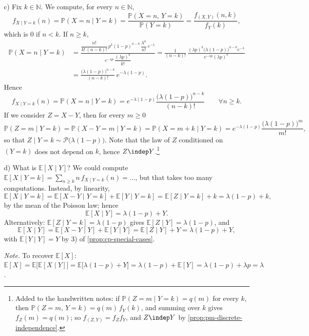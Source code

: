\begin{example}
c) Fix $k\in\mathbb N$. We compute, for every $n\in\mathbb N$,
\[
  f_{X\mid Y=k}(n)=\mathbb P(X=n\mid Y=k)=\frac{\mathbb P(X=n,\,Y=k)}{\mathbb P(Y=k)}=\frac{f_{(X,Y)}(n,k)}{f_Y(k)},
\]
which is $0$ if $n<k$. If $n\ge k$,
\[
\begin{aligned}
  \mathbb P(X=n\mid Y=k)&=\frac{\dfrac{n!}{k!\,(n-k)!}\,p^k(1-p)^{n-k}\,\dfrac{\lambda^n}{n!}\,e^{-\lambda}}{e^{-\lambda p}\,\dfrac{(\lambda p)^k}{k!}}
  =\frac1{(n-k)!}\,\frac{(\lambda p)^k\big(\lambda(1-p)\big)^{n-k}e^{-\lambda}}{e^{-\lambda p}(\lambda p)^k}\\
  &=\frac{\big(\lambda(1-p)\big)^{n-k}}{(n-k)!}\,e^{-\lambda(1-p)} .
\end{aligned}
\]
Hence
\[
  f_{X\mid Y=k}(n)=\mathbb P(X=n\mid Y=k)=e^{-\lambda(1-p)}\frac{\big(\lambda(1-p)\big)^{n-k}}{(n-k)!}\qquad\forall n\ge k .
\]
If we consider $Z=X-Y$, then for every $m\ge0$
\[
  \mathbb P(Z=m\mid Y=k)=\mathbb P(X-Y=m\mid Y=k)=\mathbb P(X=m+k\mid Y=k)=e^{-\lambda(1-p)}\frac{\big(\lambda(1-p)\big)^m}{m!},
\]
so that $Z\mid Y=k\sim\mathcal P\big(\lambda(1-p)\big)$. Note that the law of $Z$ conditioned on
$(Y=k)$ does not depend on $k$, hence $Z\indep Y$.\footnote{Added to the handwritten notes: if
$\mathbb P(Z=m\mid Y=k)=q(m)$ for every $k$, then $\mathbb P(Z=m,\,Y=k)=q(m)\,f_Y(k)$, and summing
over $k$ gives $f_Z(m)=q(m)$; so $f_{(Z,Y)}=f_Zf_Y$, and $Z\indep Y$ by
\cref{prop:pm-discrete-independence}.}

d) What is $\mathbb E[X\mid Y]$? We could compute
$\mathbb E[X\mid Y=k]=\sum_{n\ge k}n\,f_{X\mid Y=k}(n)=\dots$, but that takes too many computations.
Instead, by linearity,
\[
  \mathbb E[X\mid Y=k]=\mathbb E[X-Y\mid Y=k]+\mathbb E[Y\mid Y=k]=\mathbb E[Z\mid Y=k]+k=\lambda(1-p)+k,
\]
by the mean of the Poisson law; hence
\[
  \mathbb E[X\mid Y]=\lambda(1-p)+Y .
\]
Alternatively: $\mathbb E[Z\mid Y=k]=\lambda(1-p)$ gives $\mathbb E[Z\mid Y]=\lambda(1-p)$, and
\[
  \mathbb E[X\mid Y]=\mathbb E[X-Y\mid Y]+\mathbb E[Y\mid Y]=\mathbb E[Z\mid Y]+Y=\lambda(1-p)+Y,
\]
with $\mathbb E[Y\mid Y]=Y$ by 3) of \cref{prop:cp-special-cases}.

\emph{Note.} To recover $\mathbb E[X]$:
$\mathbb E[X]=\mathbb E\big[\mathbb E[X\mid Y]\big]=\mathbb E\big[\lambda(1-p)+Y\big]=\lambda(1-p)+\mathbb E[Y]=\lambda(1-p)+\lambda p=\lambda$.
\end{example}

